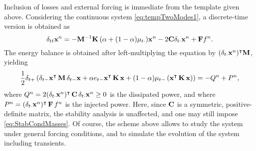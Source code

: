 Inclusion of losses and external forcing is immediate from the template given above. Considering the continuous system \eqref{eq:tempTwoModes1}, a discrete-time version is obtained as
\begin{equation}
\delta_{tt} {\bf x}^n = -{\bf M}^{-1}{\bf K}\, (\alpha + (1-\alpha)\mu_{t\cdot}) {\bf x}^n - 2{\bf C}\delta_{t\cdot} {\bf x}^n + {\bf F} f^n.
\end{equation}
The energy balance is obtained after left-multiplying the equation by $(\delta_{t\cdot} {\bf x}^n)^\intercal{\bf M}$, yielding
\begin{equation}
\frac{1}{2}\delta_{t+} \left( \delta_{t-} {\bf x}^{\intercal}\,{\bf M}\, \delta_{t-} {\bf x} + \alpha e_{t-} {\bf x}^{\intercal}\,{\bf K}\,  {\bf x} + (1-\alpha)\mu_{t-} \left({\bf x}^{\intercal}\,{\bf K}\,  {\bf x}\right)  \right)   = -Q^n+P^n,
\end{equation}
where $Q^n = 2(\delta_{t\cdot} {\bf x}^n)^\intercal \, {\bf C} \, \delta_{t\cdot} {\bf x}^n \geq 0$ is the dissipated power, and where $P^n = ({\delta_{t\cdot} {\bf x}^n})^\intercal \, {\bf F} \, f^n$ is the injected power. 
Here, since ${\bf C}$ is a symmetric, positive-definite matrix, the stability analysis is unaffected, and one may still impose \eqref{eq:StabCondMasses}. Of course, the scheme above allows to study the system under general forcing conditions, and to simulate the evolution of the system including transients. 

